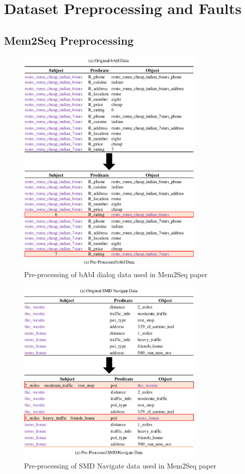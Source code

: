 \section{Dataset Preprocessing and Faults}
\label{sec:preprocess}
\subsection{Mem2Seq Preprocessing}
\label{sec:prep_mem}

\begin{figure}[ht]
\centering
\includegraphics[width=0.8\textwidth]{assets/babi-preprocess.pdf}
\caption{Pre-processing of bAbI dialog data used in Mem2Seq paper}
\label{fig:prebabi}
\end{figure}

\begin{figure}[ht]
\centering
\includegraphics[width=0.8\textwidth]{assets/smd-preprocess.pdf}
\caption{Pre-processing of SMD Navigate data used in Mem2Seq paper}
\label{fig:presmd}
\end{figure}

